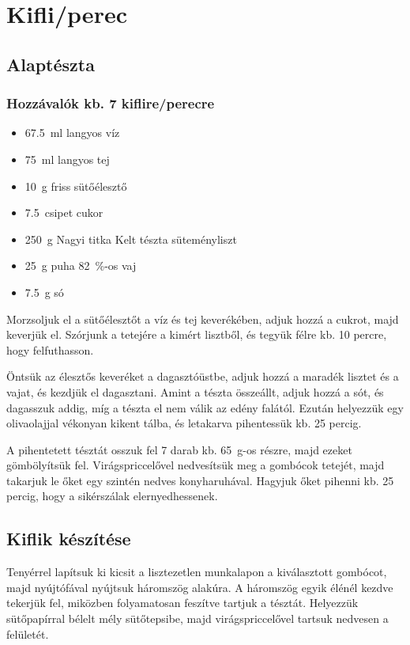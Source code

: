 \newpage
\section*{Kifli/perec} \label{sec:kifli-perec}

\subsection*{Alaptészta}
\subsubsection*{Hozzávalók kb. 7 kiflire/perecre}
\begin{itemize}
    \item \qty{67.5}{\ml} langyos víz
    \item \qty{75}{\ml} langyos tej
    \item \qty{10}{\g} friss sütőélesztő
    \item \qty{7.5}{csipet} cukor
    \item \qty{250}{\g} Nagyi titka Kelt tészta süteményliszt
    \item \qty{25}{\g} puha \qty{82}{\percent}-os vaj
    \item \qty{7.5}{\g} só
\end{itemize}

Morzsoljuk el a sütőélesztőt a víz és tej keverékében, adjuk hozzá a cukrot, majd keverjük el. Szórjunk a tetejére a kimért lisztből, és tegyük félre kb. \num{10} percre, hogy felfuthasson.

Öntsük az élesztős keveréket a dagasztóüstbe, adjuk hozzá a maradék lisztet és a vajat, és kezdjük el dagasztani. Amint a tészta összeállt, adjuk hozzá a sót, és dagasszuk addig, míg a tészta el nem válik az edény falától. Ezután helyezzük egy olivaolajjal vékonyan kikent tálba, és letakarva pihentessük kb. \num{25} percig.

A pihentetett tésztát osszuk fel \num{7} darab kb. \qty{65}{\g}-os részre, majd ezeket gömbölyítsük fel. Virágspriccelővel nedvesítsük meg a gombócok tetejét, majd takarjuk le őket egy szintén nedves konyharuhával. Hagyjuk őket pihenni kb. \num{25} percig, hogy a sikérszálak elernyedhessenek.~\cite{szabi_kifli}

\subsection*{Kiflik készítése}
Tenyérrel lapítsuk ki kicsit a lisztezetlen munkalapon a kiválasztott gombócot, majd nyújtófával nyújtsuk háromszög alakúra. A háromszög egyik élénél kezdve tekerjük fel, miközben folyamatosan feszítve tartjuk a tésztát. Helyezzük sütőpapírral bélelt mély sütőtepsibe, majd virágspriccelővel tartsuk nedvesen a felületét.

